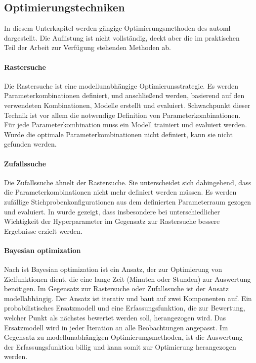 	\subsection{Optimierungstechniken}
	\label{subsec:Optimierungstechniken}
	In diesem Unterkapitel werden gängige Optimierungsmethoden des \ac{automl} dargestellt. Die Auflistung ist nicht vollständig, deckt aber die im praktischen Teil der Arbeit zur Verfügung stehenden Methoden ab.  
	
	\paragraph{Rastersuche}
	Die Rastersuche \cite{Michelucci.2018} ist eine modellunabhängige Optimierunsstrategie. Es werden Parameterkombinationen definiert, und anschließend werden, basierend auf den verwendeten Kombinationen, Modelle erstellt und evaluiert. Schwachpunkt dieser Technik ist vor allem die notwendige Definition von Parameterkombinationen. Für jede Parameterkombination muss ein Modell trainiert und evaluiert werden. Wurde die optimale  Parameterkombinationen nicht definiert, kann sie nicht gefunden werden.
	 
	\paragraph{Zufallssuche}
	Die Zufallssuche ähnelt der Rastersuche. Sie unterscheidet sich dahingehend, dass die Parameterkombinationen nicht mehr definiert werden müssen. Es werden zufällige Stichprobenkonfigurationen aus dem definierten Parameterraum gezogen und evaluiert. In \cite{BergstraJamesandYoshuaBengio..2012} wurde gezeigt, dass insbesondere bei unterschiedlicher Wichtigkeit der Hyperparameter im Gegensatz zur Rastersuche bessere Ergebnisse erzielt werden. 

	\paragraph{Bayesian optimization}
	Nach \cite{Frazier.201807} ist Bayesian optimization ist ein Ansatz, der zur Optimierung von Zielfunktionen dient, die eine lange Zeit (Minuten oder Stunden) zur Auswertung benötigen. Im Gegensatz zur Rastersuche oder Zufallssuche ist der Ansatz modellabhängig. Der Ansatz ist iterativ und baut auf zwei Komponenten auf. Ein probabilistisches Ersatzmodell und eine Erfassungsfunktion, die zur Bewertung, welcher Punkt als nächstes bewertet werden soll, herangezogen wird. Das Ersatzmodell wird in jeder Iteration an alle Beobachtungen angepasst. Im Gegensatz zu modellunabhängigen Optimierungsmethoden, ist die Auswertung der Erfassungsfunktion billig und kann somit zur Optimierung herangezogen werden. 
	
